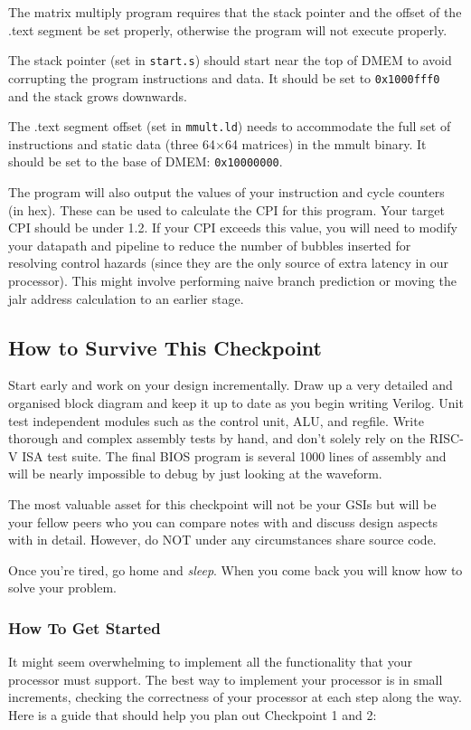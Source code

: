 \documentclass[11pt]{article}
\begin{document}
The matrix multiply program requires that the stack pointer and the offset of the .text segment be set properly, otherwise the program will not execute properly.

The stack pointer (set in \verb|start.s|) should start near the top of DMEM to avoid corrupting the program instructions and data.
It should be set to \verb|0x1000fff0| and the stack grows downwards.

The .text segment offset (set in \verb|mmult.ld|) needs to accommodate the full set of instructions and static data (three 64$\times$64 matrices) in the mmult binary.
It should be set to the base of DMEM: \verb|0x10000000|.

The program will also output the values of your instruction and cycle counters (in hex).
These can be used to calculate the CPI for this program.
Your target CPI should be under 1.2.
If your CPI exceeds this value, you will need to modify your datapath and pipeline to reduce the number of bubbles inserted for resolving control hazards (since they are the only source of extra latency in our processor).
This might involve performing naive branch prediction or moving the jalr address calculation to an earlier stage.

\subsection{How to Survive This Checkpoint}
Start early and work on your design incrementally.
Draw up a very detailed and organised block diagram and keep it up to date as you begin writing Verilog.
Unit test independent modules such as the control unit, ALU, and regfile.
Write thorough and complex assembly tests by hand, and don't solely rely on the RISC-V ISA test suite.
The final BIOS program is several 1000 lines of assembly and will be nearly impossible to debug by just looking at the waveform.

The most valuable asset for this checkpoint will not be your GSIs but will be your fellow peers who you can compare notes with and discuss design aspects with in detail.
However, do NOT under any circumstances share source code.

Once you're tired, go home and \textit{sleep}. When you come back you will know how to solve your problem.

\subsubsection{How To Get Started}
It might seem overwhelming to implement all the functionality that your processor must support. The best way to implement your processor is in small increments, checking the correctness of your processor at each step along the way. Here is a guide that should help you plan out Checkpoint 1 and 2:
\end{document}
